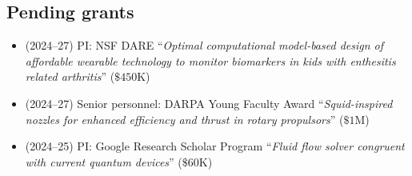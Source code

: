 \subsection{Pending grants}

\begin{itemize}
    \item (2024--27) PI: NSF DARE ``\textit{Optimal computational model-based design of affordable wearable technology to monitor biomarkers in kids with enthesitis related arthritis}'' ($\$450$K)
    \item (2024--27) Senior personnel: DARPA Young Faculty Award ``\textit{Squid-inspired nozzles for enhanced  efficiency and thrust in rotary propulsors}'' ($\$1$M)
    \item (2024--25) PI: Google Research Scholar Program ``\textit{Fluid flow solver congruent with current quantum devices}'' ($\$60$K)
\end{itemize}
